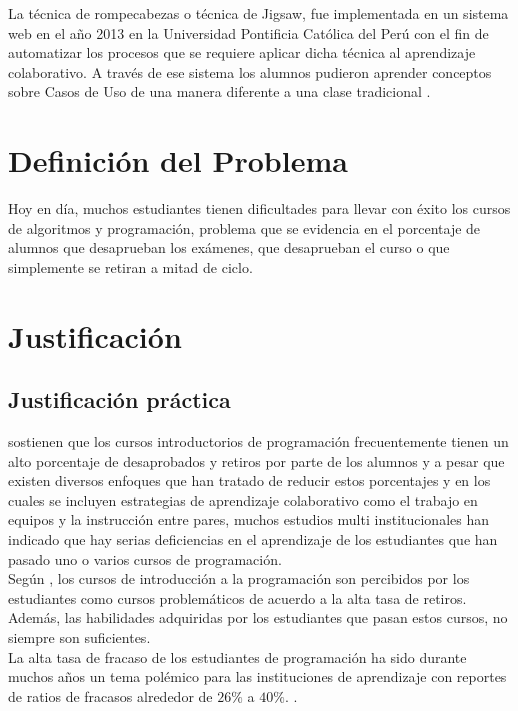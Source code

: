 La técnica de rompecabezas o técnica de Jigsaw, fue implementada en un sistema web en el año 2013 en la Universidad Pontificia Católica del Perú con el fin de automatizar los procesos que se requiere aplicar dicha técnica al aprendizaje colaborativo. A través de ese sistema los alumnos pudieron aprender conceptos sobre Casos de Uso de una manera diferente a una clase tradicional \cite{pinzas_desarrollo_2013}.\\

\section{Definición del Problema}
 Hoy en día, muchos estudiantes tienen dificultades para llevar con éxito los cursos de algoritmos y programación, problema que se evidencia en el porcentaje de alumnos que desaprueban los exámenes, que desaprueban el curso o que simplemente se retiran a mitad de ciclo.

\section{Justificación}
\subsection{Justificación práctica}
 sostienen que los cursos introductorios de programación frecuentemente tienen un alto porcentaje de desaprobados y retiros por parte de los alumnos y a pesar que existen diversos enfoques que han tratado de reducir estos porcentajes y en los cuales se incluyen estrategias de aprendizaje colaborativo como el trabajo en equipos y la instrucción entre pares, muchos estudios multi institucionales \cite{mccracken_multi-national_2001,lister_multi-national_2004,Tenenberg_studentsdesigning_2005} han indicado que hay serias deficiencias en el aprendizaje de los estudiantes que han pasado uno o varios cursos de programación.\\

Según , los cursos de introducción a la programación son percibidos por los estudiantes como cursos problemáticos de acuerdo a la alta tasa de retiros. Además, las habilidades adquiridas por los estudiantes que pasan estos cursos, no siempre son suficientes.\\

La alta tasa de fracaso de los estudiantes de programación ha sido durante muchos años un tema polémico para las instituciones de aprendizaje con reportes de ratios de fracasos alrededor de $26\%$ a $40\%$. \cite{sheard_our_1998,truong_web_2003,lang_seven_2007,han_enhancement_2010}.\\

